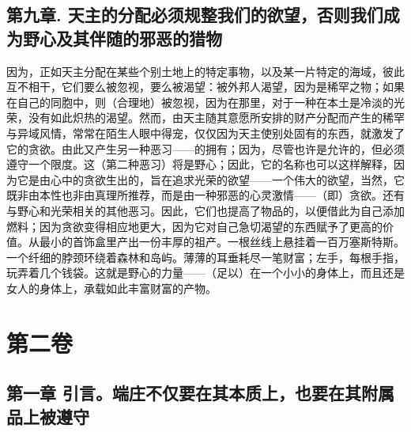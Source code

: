 
\subsection{第九章. 天主的分配必须规整我们的欲望，否则我们成为野心及其伴随的邪恶的猎物}

因为，正如天主分配在某些个别土地上的特定事物，以及某一片特定的海域，彼此互不相干，它们要么被忽视，要么被渴望：被外邦人渴望，因为是稀罕之物；如果在自己的同胞中，则（合理地）被忽视，因为在那里，对于一种在本土是冷淡的光荣，没有如此炽热的渴望。然而，由天主随其意愿所安排的财产分配而产生的稀罕与异域风情，常常在陌生人眼中得宠，仅仅因为天主使别处固有的东西，就激发了它的贪欲。由此又产生另一种恶习——的拥有；因为，尽管也许是允许的，但必须遵守一个限度。这（第二种恶习）将是野心；因此，它的名称也可以这样解释，因为它是由心中的贪欲生出的，旨在追求光荣的欲望——一个伟大的欲望，当然，它既非由本性也非由真理所推荐，而是由一种邪恶的心灵激情——（即）贪欲。还有与野心和光荣相关的其他恶习。因此，它们也提高了物品的，以便借此为自己添加燃料；因为贪欲变得相应地更大，因为它对自己急切渴望的东西赋予了更高的价值。从最小的首饰盒里产出一份丰厚的祖产。一根丝线上悬挂着一百万塞斯特斯。一个纤细的脖颈环绕着森林和岛屿。薄薄的耳垂耗尽一笔财富；左手，每根手指，玩弄着几个钱袋。这就是野心的力量——（足以）在一个小小的身体上，而且还是女人的身体上，承载如此丰富财富的产物。\par


\section{第二卷}


\subsection{第一章 引言。端庄不仅要在其本质上，也要在其附属品上被遵守}

